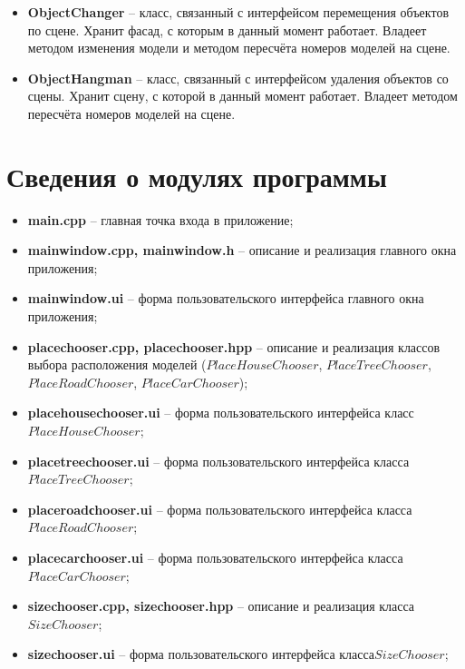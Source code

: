 \documentclass[a4paper,14pt, unknownkeysallowed]{extreport}
\begin{document}
\begin{itemize}
	\item \textbf{ObjectChanger} -- класс, связанный с интерфейсом перемещения объектов по сцене. Хранит фасад, с которым в данный момент работает. Владеет методом изменения модели и методом пересчёта номеров моделей на сцене.
	\item \textbf{ObjectHangman} -- класс, связанный с интерфейсом удаления объектов со сцены. Хранит сцену, с которой в данный момент работает. Владеет методом пересчёта номеров моделей на сцене.
\end{itemize}


\section{Сведения о модулях программы}

\begin{itemize}
	\item \textbf{main.cpp} -- главная точка входа в приложение;
	\item \textbf{mainwindow.cpp, mainwindow.h} -- описание и реализация главного окна приложения;
	\item \textbf{mainwindow.ui} -- форма пользовательского интерфейса главного окна приложения;
	\item \textbf{placechooser.cpp, placechooser.hpp} -- описание и реализация классов выбора расположения моделей ($PlaceHouseChooser$, $PlaceTreeChooser$, $PlaceRoadChooser$, $PlaceCarChooser$);
	\item \textbf{placehousechooser.ui} -- форма пользовательского интерфейса класс\linebreak $PlaceHouseChooser$;
	\item \textbf{placetreechooser.ui} -- форма пользовательского интерфейса класса\linebreak $PlaceTreeChooser$;
	\item \textbf{placeroadсhooser.ui} -- форма пользовательского интерфейса класса\linebreak $PlaceRoadChooser$;
	\item \textbf{placecarсhooser.ui} -- форма пользовательского интерфейса класса\linebreak $PlaceCarChooser$;
	\item \textbf{sizechooser.cpp, sizechooser.hpp} -- описание и реализация класса\linebreak $SizeChooser$;
	\item \textbf{sizechooser.ui} -- форма пользовательского интерфейса класса\linebreak $SizeChooser$;

\end{itemize}
\end{document}
